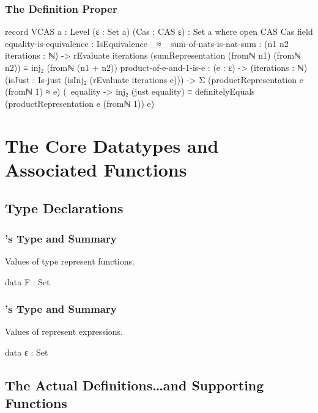 \documentclass{report}
\begin{document}
\subsection{The Definition Proper}

\begin{code}
record VCAS {a : Level} (ε : Set a) (Cas : CAS ε) : Set a where
  open CAS Cas
  field
    equality-is-equivalence : IsEquivalence _≈_
    sum-of-nats-is-nat-sum :
      (n1 n2 iterations : ℕ) ->
      rEvaluate iterations (sumRepresentation (fromℕ n1) (fromℕ n2)) ≡
        inj₂ (fromℕ (n1 + n2))
    product-of-e-and-1-is-e :
      (e : ε) ->
      (iterations : ℕ)
      (isJust : Is-just (isInj₂ (rEvaluate iterations e))) ->
      Σ (productRepresentation e (fromℕ 1) ≈ e)
        (\ equality -> inj₂ (just equality) ≡ definitelyEquals (productRepresentation e (fromℕ 1)) e)
\end{code}

\chapter{The Core Datatypes and Associated Functions}

\section{Type Declarations}

\subsection{'s Type and Summary}
Values of type  represent functions.

\begin{code}
data F : Set
\end{code}

\subsection{'s Type and Summary}
Values of  represent expressions.

\begin{code}
data ε : Set
\end{code}

\section{The Actual Definitions\ldots and Supporting Functions}
\end{document}
